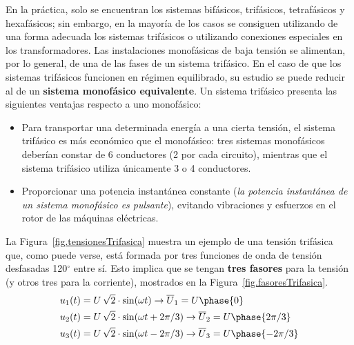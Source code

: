 \documentclass[11pt]{book} %
\begin{document}
	En la práctica, solo se encuentran los sistemas bifásicos, trifásicos, tetrafásicos y hexafásicos; sin embargo, en la mayoría de los casos se consiguen utilizando de una forma adecuada los sistemas trifásicos o utilizando conexiones especiales en los transformadores. Las instalaciones monofásicas de baja tensión se alimentan, por lo general, de una de las fases de un sistema trifásico. En el caso de que los sistemas trifásicos funcionen en régimen equilibrado, su estudio se puede reducir al de un \textbf{sistema monofásico equivalente}. Un sistema trifásico presenta las siguientes ventajas respecto a uno monofásico:
	\begin{itemize}
		\item Para transportar una determinada energía a una cierta tensión, el sistema trifásico es más económico que el monofásico: tres sistemas monofásicos deberían constar de 6 conductores (2 por cada circuito), mientras que el sistema trifásico utiliza únicamente 3 o 4 conductores.
		\item Proporcionar una potencia instantánea constante (\emph{la potencia instantánea de un sistema monofásico es pulsante}), evitando vibraciones y esfuerzos en el rotor de las máquinas eléctricas.
	\end{itemize}
	La Figura~\ref{fig.tensionesTrifasica} muestra un ejemplo de una tensión trifásica que, como puede verse, está formada por tres funciones de onda de tensión desfasadas 120$^\circ$ entre sí. Esto implica que se tengan \textbf{tres fasores} para la tensión (y otros tres para la corriente), mostrados en la Figura~\ref{fig.fasoresTrifasica}. 
	\begin{align*}
		u_1(t) &= U\,\sqrt{2}\cdot \sin(\omega t)\rightarrow  \overline{U}_1 = U\phase{0}\\
		u_2(t) &= U\,\sqrt{2} \cdot\sin(\omega t + 2\pi/3) \rightarrow  \overline{U}_2 = U\phase{2\pi/3}\\
		u_3(t) &= U\,\sqrt{2}\cdot \sin(\omega t - 2\pi/3) \rightarrow  \overline{U}_3 = U\phase{-2\pi/3}
	\end{align*}
\end{document}
